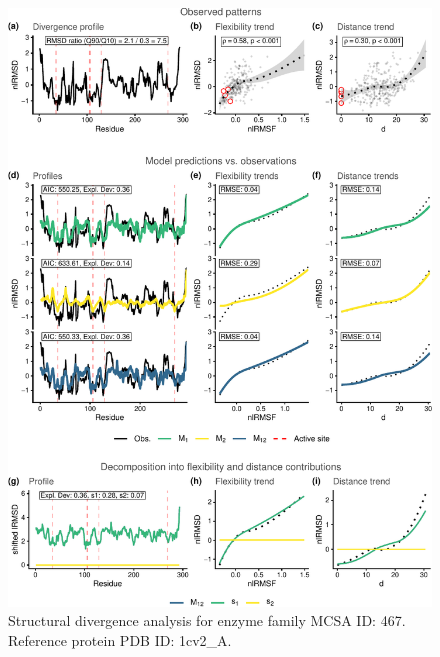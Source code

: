 \documentclass[
]{article}
\begin{document}
\clearpage
\begin{figure}[H]
\centering


\begin{center}\includegraphics{supplementary_material_files/figure-latex/generate_figures-23} \end{center}

\caption{Structural divergence analysis for enzyme family MCSA ID: 467. Reference protein PDB ID: 1cv2\_A.}
\end{figure}
\end{document}
